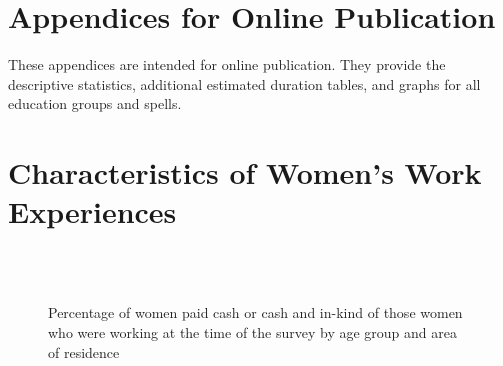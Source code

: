 \documentclass[12pt,letterpaper]{article}
\begin{document}
\section*{Appendices for Online Publication}

These appendices are intended for online publication.
They provide the descriptive statistics, additional
estimated duration tables, and graphs for all 
education groups and spells.

\clearpage
\newpage

\section{Characteristics of Women's Work Experiences}

\setcounter{figure}{0}
\setcounter{table}{0}


\begin{figure}[!htpb]
\centering
{}
\\
\\
\caption{Percentage of women paid cash or cash and in-kind of those women who were 
working at the time of the survey by age group and area of residence}
\label{fig:work_cash_by_survey}
\end{figure}
\end{document}
